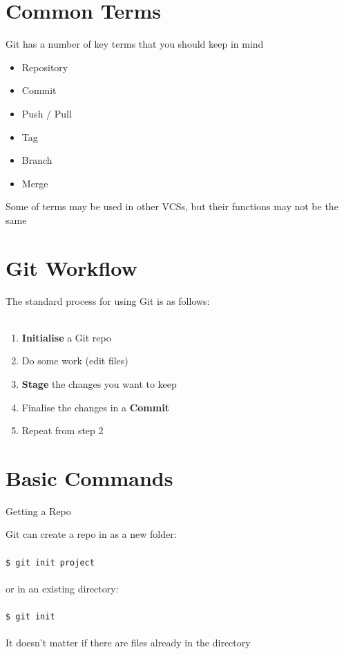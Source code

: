 \documentclass{beamer}
\begin{document}
\section{Common Terms}
\begin{frame}{\secname}
    Git has a number of key terms that you should keep in mind
    \begin{itemize}
    \item Repository 
    \item Commit
    \item Push / Pull
    \item Tag
    \item Branch
    \item Merge
    \end{itemize}
    Some of terms may be used in other VCSs, but their functions may not be
    the same

\end{frame}

\section{Git Workflow}
\begin{frame}{\secname}
    The standard process for using Git is as follows: \\~\\
    \begin{enumerate}
        \item {\bf Initialise} a Git repo
        \item Do some work (edit files)
        \item {\bf Stage} the changes you want to keep
        \item Finalise the changes in a {\bf Commit}
        \item Repeat from step 2
    \end{enumerate}
\end{frame}

\section{Basic Commands}
\begin{frame}{Getting a Repo}
    
    Git can create a repo in as a new folder:\\~\\

    {\tt \$ git init project} \\~\\

    or in an existing directory: \\~\\

    {\tt \$ git init} \\~\\

    It doesn't matter if there are files already in the directory

\end{frame}
\end{document}
